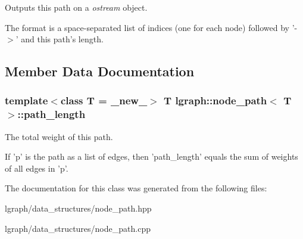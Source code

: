 Outputs this path on a {\itshape ostream} object. 

The format is a space-\/separated list of indices (one for each node) followed by '-\/$>$' and this path's length. 

\subsection{Member Data Documentation}
\hypertarget{classlgraph_1_1node__path_a3461f9839615e5bc4837d24438117f16}{
\subsubsection[{path\-\_\-length}]{\setlength{\rightskip}{0pt plus 5cm}template$<$class T = \-\_\-new\-\_\-$>$ T {\bf lgraph\-::node\-\_\-path}$<$ T $>$\-::path\-\_\-length\hspace{0.3cm}{\ttfamily [private]}}}\label{classlgraph_1_1node__path_a3461f9839615e5bc4837d24438117f16}


The total weight of this path. 

If 'p' is the path as a list of edges, then 'path\-\_\-length' equals the sum of weights of all edges in 'p'. 

The documentation for this class was generated from the following files\-:\begin{DoxyCompactItemize}
\item 
lgraph/data\-\_\-structures/node\-\_\-path.\-hpp\item 
lgraph/data\-\_\-structures/node\-\_\-path.\-cpp\end{DoxyCompactItemize}

